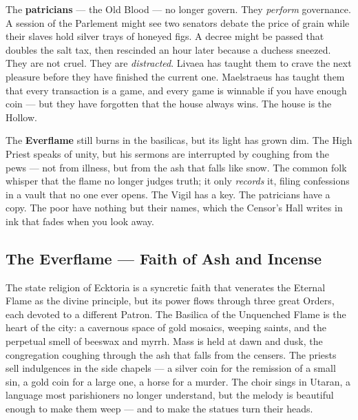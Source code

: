 The \textbf{patricians} --- the Old Blood --- no longer govern. They \emph{perform} governance. A session of the Parlement might see two senators debate the price of grain while their slaves hold silver trays of honeyed figs. A decree might be passed that doubles the salt tax, then rescinded an hour later because a duchess sneezed. They are not cruel. They are \emph{distracted}. Livaea has taught them to crave the next pleasure before they have finished the current one. Maelstraeus has taught them that every transaction is a game, and every game is winnable if you have enough coin --- but they have forgotten that the house always wins. The house is the Hollow.

The \textbf{Everflame} still burns in the basilicas, but its light has grown dim. The High Priest speaks of unity, but his sermons are interrupted by coughing from the pews --- not from illness, but from the ash that falls like snow. The common folk whisper that the flame no longer judges truth; it only \textit{records} it, filing confessions in a vault that no one ever opens. The Vigil has a key. The patricians have a copy. The poor have nothing but their names, which the Censor's Hall writes in ink that fades when you look away.

\subsection*{The Everflame --- Faith of Ash and Incense}
The state religion of Ecktoria is a syncretic faith that venerates the Eternal Flame as the divine principle, but its power flows through three great Orders, each devoted to a different Patron. The Basilica of the Unquenched Flame is the heart of the city: a cavernous space of gold mosaics, weeping saints, and the perpetual smell of beeswax and myrrh. Mass is held at dawn and dusk, the congregation coughing through the ash that falls from the censers. The priests sell indulgences in the side chapels --- a silver coin for the remission of a small sin, a gold coin for a large one, a horse for a murder. The choir sings in Utaran, a language most parishioners no longer understand, but the melody is beautiful enough to make them weep --- and to make the statues turn their heads.

